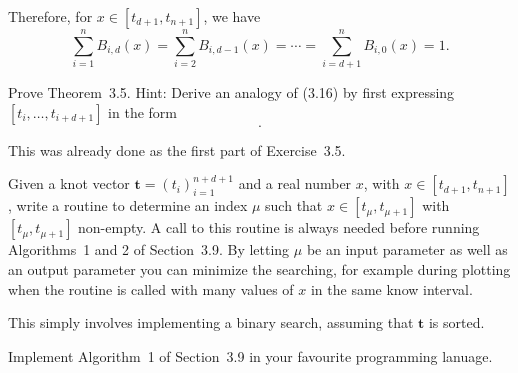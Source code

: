 \begin{solution}
    Therefore, for $x \in [t_{d+1}, t_{n+1}]$, we have
    \begin{equation*}
        \sum_{i = 1}^{n} B_{i, d}(x) = \sum_{i = 2}^{n} B_{i, d-1}(x) = \cdots = \sum_{i = d+1}^{n} B_{i, 0}(x) = 1.
    \end{equation*}
\end{solution}

\begin{exercise}
    Prove Theorem~3.5.
    Hint: Derive an analogy of (3.16) by first expressing $[t_i, \ldots, t_{i+d+1}]$ in the form
    \begin{equation*}
        [t_j, t_i, \ldots, \hat{t}_j, \ldots, t_{i+d+1}].
    \end{equation*}
\end{exercise}

\begin{solution}
    This was already done as the first part of Exercise~3.5.
\end{solution}

\begin{exercise}
    Given a knot vector $\mathbf{t} = (t_i)_{i=1}^{n+d+1}$ and a real number $x$, with $x \in [t_{d+1}, t_{n+1}]$, write a routine to determine an index $\mu$ such that $x \in [t_{\mu}, t_{\mu+1}]$ with $[t_{\mu}, t_{\mu+1}]$ non-empty.
    A call to this routine is always needed before running Algorithms~1 and 2 of Section~3.9.
    By letting $\mu$ be an input parameter as well as an output parameter you can minimize the searching, for example during plotting when the routine is called with many values of $x$ in the same know interval.
\end{exercise}

\begin{solution}
    This simply involves implementing a binary search, assuming that $\mathbf{t}$ is sorted.
\end{solution}

\begin{exercise}
    Implement Algorithm~1 of Section~3.9 in your favourite programming lanuage.
\end{exercise}

